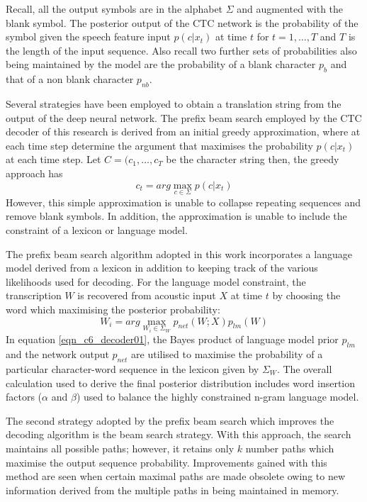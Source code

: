 Recall, all the output symbols are in the alphabet $\Sigma$ and augmented with the blank symbol. The posterior output of the CTC network is the probability of the symbol given the speech feature input $p(c|x_t)$ at time $t$ for $t=1,\dots,T$ and $T$ is the length of the input sequence.  Also recall two further sets of probabilities also being maintained by the model are the probability of a blank character $p_b$ and that of a non blank character $p_{nb}$.

Several strategies have been employed to obtain a translation string from the output of the deep neural network.  The prefix beam search employed by the CTC decoder of this research is derived from an initial greedy approximation, where at each time step determine the argument that maximises the  probability $p(c|x_t)$ at each time step. Let $C=(c_1,\dots,c_T$ be the character string then, the greedy approach has 
\begin{equation}
    c_t=arg\max_{c\in\Sigma}p(c|x_t)
\end{equation}
However, this simple approximation is unable to collapse repeating sequences and remove blank symbols. In addition, the approximation is unable to include the constraint of a lexicon or language model.

The prefix beam search algorithm \cite{hannun2014first} adopted in this work incorporates a language model derived from a lexicon in addition to keeping track of the various likelihoods used for decoding.  For the language model constraint, the transcription $W$ is recovered from acoustic input $X$ at time $t$ by choosing the word which maximising the posterior probability:
\begin{equation}
W_i=arg\max_{W_i \in \Sigma_W} p_{net}(W;X)p_{lm}(W)
\label{eqn_c6_decoder01}
\end{equation}
In equation \ref{eqn_c6_decoder01}, the Bayes product of language model prior $p_{lm}$ and the network output $p_{net}$ are utilised to maximise the probability of a particular character-word sequence in the lexicon given by $\Sigma_W$.  The overall calculation used to derive the final posterior distribution includes word insertion factors ($\alpha$ and $\beta$) used to balance the highly constrained n-gram language model.

The second strategy adopted by the prefix beam search which improves the decoding algorithm is the beam search strategy.  With this approach, the search maintains all possible paths; however, it retains only $k$ number paths which maximise the output sequence probability.  Improvements gained with this method are seen when certain maximal paths are made obsolete owing to new information derived from the multiple paths in being maintained in memory. 


